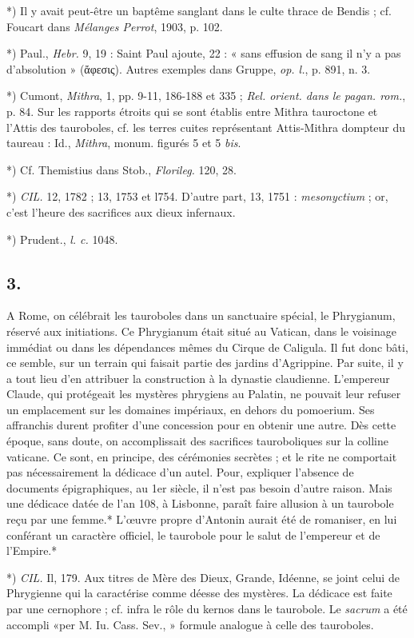 \documentclass[a4paper, 11pt, oneside, polutonikogreek, french]{article}
\begin{document}
*) Il y avait peut-être un baptême sanglant dans le culte thrace de Bendis ; cf. Foucart dans \emph{Mélanges Perrot}, 1903, p. 102.

*) Paul., \emph{Hebr.} 9, 19 : Saint Paul ajoute, 22 : « sans effusion de sang il n'y a pas d'absolution » (ἄφεσις). Autres exemples dans Gruppe, \emph{op. l.}, p. 891, n. 3.

*) Cumont, \emph{Mithra}, 1, pp. 9-11, 186-188 et 335 ; \emph{Rel. orient. dans le pagan. rom.}, p. 84. Sur les rapports étroits qui se sont établis entre Mithra tauroctone et l'Attis des tauroboles, cf. les terres cuites représentant Attis-Mithra dompteur du taureau : Id., \emph{Mithra}, monum. figurés 5 et 5 \emph{bis}.

*) Cf. Themistius dans Stob., \emph{Florileg.} 120, 28.

*) \emph{CIL.} 12, 1782 ; 13, 1753 et l754. D'autre part, 13, 1751 : \emph{mesonyctium} ; or, c'est l'heure des sacrifices aux dieux infernaux.

*) Prudent., \emph{l. c.} 1048.

\subsection{3.}

A Rome, on célébrait les tauroboles dans un sanctuaire spécial, le Phrygianum, réservé aux initiations. Ce Phrygianum était situé au Vatican, dans le voisinage immédiat ou dans les dépendances mêmes du Cirque de Caligula. Il fut donc bâti, ce semble, sur un terrain qui faisait partie des jardins d'Agrippine. Par suite, il y a tout lieu d'en attribuer la construction à la dynastie claudienne. L'empereur Claude, qui protégeait les mystères phrygiens au Palatin, ne pouvait leur refuser un emplacement sur les domaines impériaux, en dehors du pomoerium. Ses affranchis durent profiter d'une concession pour en obtenir une autre. Dès cette époque, sans doute, on accomplissait des sacrifices tauroboliques sur la colline vaticane. Ce sont, en principe, des cérémonies secrètes ; et le rite ne comportait pas nécessairement la dédicace d'un autel. Pour, expliquer l'absence de documents épigraphiques, au 1er siècle, il n'est pas besoin d'autre raison. Mais une dédicace datée de l'an 108, à Lisbonne, paraît faire allusion à un taurobole reçu par une femme.* L'œuvre propre d'Antonin aurait été de romaniser, en lui conférant un caractère officiel, le taurobole pour le salut de l'empereur et de l'Empire.*

*) \emph{CIL.} Il, 179. Aux titres de Mère des Dieux, Grande, Idéenne, se joint celui de Phrygienne qui la caractérise comme déesse des mystères. La dédicace est faite par une cernophore ; cf. infra le rôle du kernos dans le taurobole. Le \emph{sacrum} a été accompli «per M. Iu. Cass. Sev., » formule analogue à celle des tauroboles.
\end{document}
